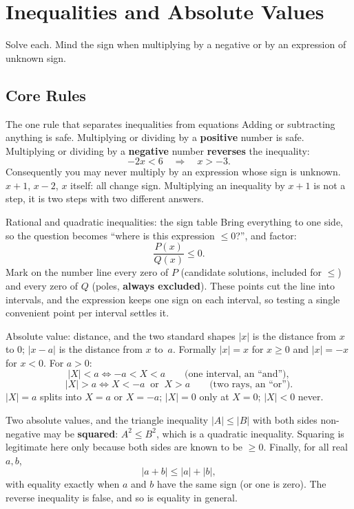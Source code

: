 \chapter{Inequalities and Absolute Values}

Solve each. Mind the sign when multiplying by a negative or by an
expression of unknown sign.

\section{Core Rules}

\begin{rulebox}{The one rule that separates inequalities from equations}
Adding or subtracting anything is safe. Multiplying or dividing by a
\textbf{positive} number is safe. Multiplying or dividing by a
\textbf{negative} number \textbf{reverses} the inequality:
\[
  -2x<6\quad\Longrightarrow\quad x>-3 .
\]
Consequently you may never multiply by an expression whose sign is unknown.
$x+1$, $x-2$, $x$ itself: all change sign. Multiplying an inequality by
$x+1$ is not a step, it is two steps with two different answers.
\end{rulebox}

\begin{rulebox}{Rational and quadratic inequalities: the sign table}
Bring everything to one side, so the question becomes ``where is this
expression $\le0$?'', and factor:
\[
  \frac{P(x)}{Q(x)}\le0 .
\]
Mark on the number line every zero of $P$ (candidate solutions, included for
$\le$) and every zero of $Q$ (poles, \textbf{always excluded}). These points
cut the line into intervals, and the expression keeps one sign on each
interval, so testing a single convenient point per interval settles it.
\end{rulebox}

\begin{rulebox}{Absolute value: distance, and the two standard shapes}
$|x|$ is the distance from $x$ to $0$; $|x-a|$ is the distance from $x$
to~$a$. Formally $|x|=x$ for $x\ge0$ and $|x|=-x$ for $x<0$. For $a>0$:
\[
  |X|<a \iff -a<X<a
  \qquad\text{(one interval, an ``and'')},
\]
\[
  |X|>a \iff X<-a\ \text{ or }\ X>a
  \qquad\text{(two rays, an ``or'')}.
\]
$|X|=a$ splits into $X=a$ or $X=-a$; $|X|=0$ only at $X=0$; $|X|<0$ never.
\end{rulebox}

\begin{rulebox}{Two absolute values, and the triangle inequality}
$|A|\le|B|$ with both sides non-negative may be \textbf{squared}:
$A^{2}\le B^{2}$, which is a quadratic inequality. Squaring is legitimate
here only because both sides are known to be $\ge0$. Finally, for all real
$a,b$,
\[
  |a+b|\le|a|+|b| ,
\]
with equality exactly when $a$ and $b$ have the same sign (or one is zero).
The reverse inequality is false, and so is equality in general.
\end{rulebox}


